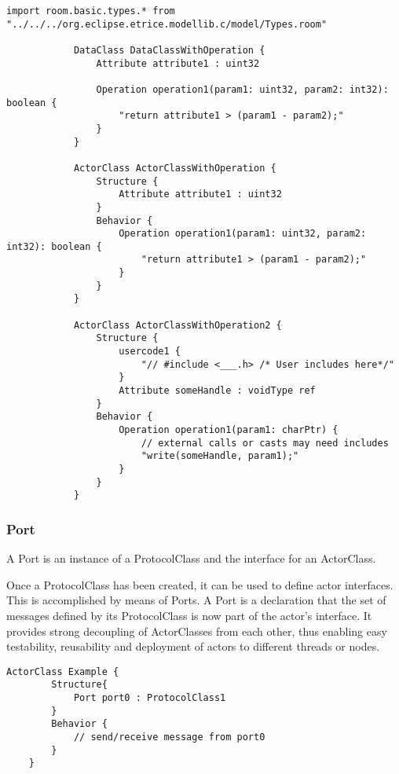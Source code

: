 			\begin{lstlisting}[language=ROOM]
			import room.basic.types.* from "../../../org.eclipse.etrice.modellib.c/model/Types.room"
		
			DataClass DataClassWithOperation {
				Attribute attribute1 : uint32
				
				Operation operation1(param1: uint32, param2: int32): boolean {
					"return attribute1 > (param1 - param2);"
				}
			}
			
			ActorClass ActorClassWithOperation {
				Structure {
					Attribute attribute1 : uint32
				}
				Behavior {
					Operation operation1(param1: uint32, param2: int32): boolean {
						"return attribute1 > (param1 - param2);"
					}
				}
			}
			
			ActorClass ActorClassWithOperation2 {
				Structure {
					usercode1 {
						"// #include <___.h> /* User includes here*/"
					}
					Attribute someHandle : voidType ref
				}
				Behavior {
					Operation operation1(param1: charPtr) {
						// external calls or casts may need includes
						"write(someHandle, param1);"
					}
				}
			}
			\end{lstlisting}
	
	\vspace{\baselineskip}
	\vspace{\baselineskip}
	\vspace{\baselineskip}
	
\subsubsection{Port}
	\hypertarget{ref:Port}{}
	A Port is an instance of a ProtocolClass and the interface for an ActorClass.
		
	Once a ProtocolClass has been created, it can be used to define actor interfaces. This is accomplished by means of Ports. 
	A Port is a declaration that the set of messages defined by its ProtocolClass is now part of the actor's interface.
	It provides strong decoupling of ActorClasses from each other, thus enabling easy testability, reusability and deployment of actors to different threads or nodes.
	
	\begin{lstlisting}[language=ROOM]
	ActorClass Example {
		Structure{
			Port port0 : ProtocolClass1
		}
		Behavior {
			// send/receive message from port0
		}
	}
	\end{lstlisting}
	
